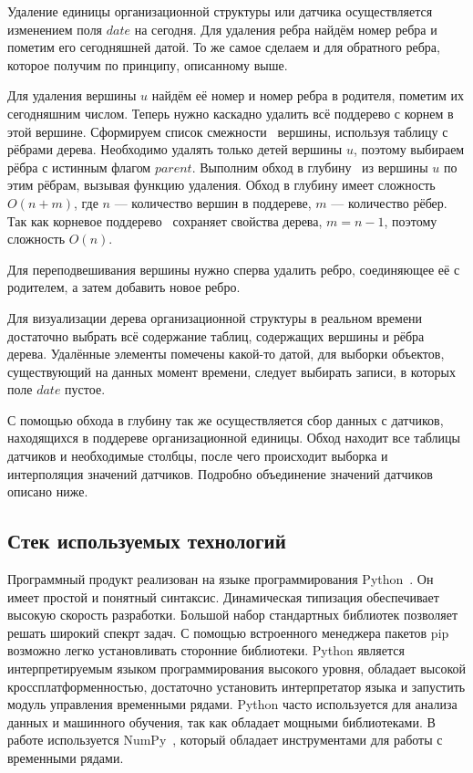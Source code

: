 Удаление единицы организационной структуры или датчика осуществляется изменением поля $date$ на сегодня. Для удаления ребра найдём номер ребра и пометим его сегодняшней датой. То же самое сделаем и для обратного ребра, которое получим по принципу, описанному выше.

Для удаления вершины $u$ найдём её номер и номер ребра в родителя, пометим их сегодняшним числом. Теперь нужно каскадно удалить всё поддерево с корнем в этой вершине. Сформируем список смежности~\cite{graphs} вершины, используя таблицу с рёбрами дерева. Необходимо удалять только детей вершины $u$, поэтому выбираем рёбра с истинным флагом $parent$. Выполним обход в глубину~\cite{dfs1, dfs2} из вершины $u$ по этим рёбрам, вызывая функцию удаления. Обход в глубину имеет сложность $O(n + m)$, где $n$ --- количество вершин в поддереве, $m$ --- количество рёбер. Так как корневое поддерево~\cite{rooted-trees} сохраняет свойства дерева, $m = n - 1$, поэтому сложность $O(n)$.

Для переподвешивания вершины нужно сперва удалить ребро, соединяющее её с родителем, а затем добавить новое ребро.

Для визуализации дерева организационной структуры в реальном времени достаточно выбрать всё содержание таблиц, содержащих вершины и рёбра дерева. Удалённые элементы помечены какой-то датой, для выборки объектов, существующий на данных момент времени, следует выбирать записи, в которых поле $date$ пустое.

С помощью обхода в глубину так же осуществляется сбор данных с датчиков, находящихся в поддереве организационной единицы. Обход находит все таблицы датчиков и необходимые столбцы, после чего происходит выборка и интерполяция значений датчиков. Подробно объединение значений датчиков описано ниже.

\subsection{Стек используемых технологий}

Программный продукт реализован на языке программирования Python~\cite{Python}. Он имеет простой и понятный синтаксис. Динамическая типизация обеспечивает высокую скорость разработки. Большой набор стандартных библиотек позволяет решать широкий спекрт задач. С помощью встроенного менеджера пакетов pip возможно легко установливать сторонние библиотеки. Python является интерпретируемым языком программирования высокого уровня, обладает высокой кроссплатформенностью, достаточно установить интерпретатор языка и запустить модуль управления временными рядами. Python часто используется для анализа данных и машинного обучения, так как обладает мощными библиотеками. В работе используется NumPy~\cite{numpy}, который обладает инструментами для работы с временными рядами.

